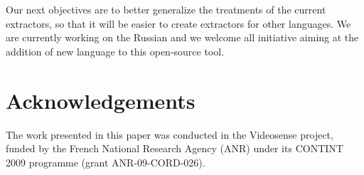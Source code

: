 \documentclass[sw]{iosart2c}
\begin{document}
Our next objectives are to better generalize the treatments of the current extractors, so that it will be easier to create extractors for other languages. We are currently working on the Russian and we welcome all initiative aiming at the addition of new language to this open-source tool.

\section{Acknowledgements}

The work presented in this paper was conducted in the Videosense project, funded by the French National Research Agency (ANR) under its CONTINT 2009 programme (grant ANR-09-CORD-026).













   



\end{document}
